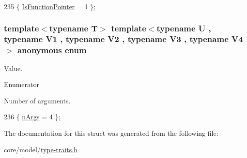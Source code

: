 \begin{DoxyCode}
235 \{ \hyperlink{structTypeTraits_1_1FunctionPtrTraits_3_01U_07_5_08_07V1_00_01V2_00_01V3_00_01V4_08_4_a514c784eb72b113be94d1584fcb53873a1ec8290a45f25f538aa02b6af5ad3f3a}{IsFunctionPointer} = 1    \};
\end{DoxyCode}
\subsubsection[{\texorpdfstring{anonymous enum}{anonymous enum}}]{\setlength{\rightskip}{0pt plus 5cm}template$<$typename T$>$ template$<$typename U , typename V1 , typename V2 , typename V3 , typename V4 $>$ anonymous enum}\hypertarget{structTypeTraits_1_1FunctionPtrTraits_3_01U_07_5_08_07V1_00_01V2_00_01V3_00_01V4_08_4_a7227e3e6b099ae6f36aa97d0713839bf}{}\label{structTypeTraits_1_1FunctionPtrTraits_3_01U_07_5_08_07V1_00_01V2_00_01V3_00_01V4_08_4_a7227e3e6b099ae6f36aa97d0713839bf}
Value. \begin{Desc}
\item[Enumerator]\par
\begin{description}
\item[{\em 
n\+Args\hypertarget{structTypeTraits_1_1FunctionPtrTraits_3_01U_07_5_08_07V1_00_01V2_00_01V3_00_01V4_08_4_a7227e3e6b099ae6f36aa97d0713839bfa82001a8808dc0254d9e8159be647fd47}{}\label{structTypeTraits_1_1FunctionPtrTraits_3_01U_07_5_08_07V1_00_01V2_00_01V3_00_01V4_08_4_a7227e3e6b099ae6f36aa97d0713839bfa82001a8808dc0254d9e8159be647fd47}
}]Number of arguments. \end{description}
\end{Desc}

\begin{DoxyCode}
236 \{ \hyperlink{structTypeTraits_1_1FunctionPtrTraits_3_01U_07_5_08_07V1_00_01V2_00_01V3_00_01V4_08_4_a7227e3e6b099ae6f36aa97d0713839bfa82001a8808dc0254d9e8159be647fd47}{nArgs} = 4                \};
\end{DoxyCode}


The documentation for this struct was generated from the following file\+:\begin{DoxyCompactItemize}
\item 
core/model/\hyperlink{type-traits_8h}{type-\/traits.\+h}\end{DoxyCompactItemize}
